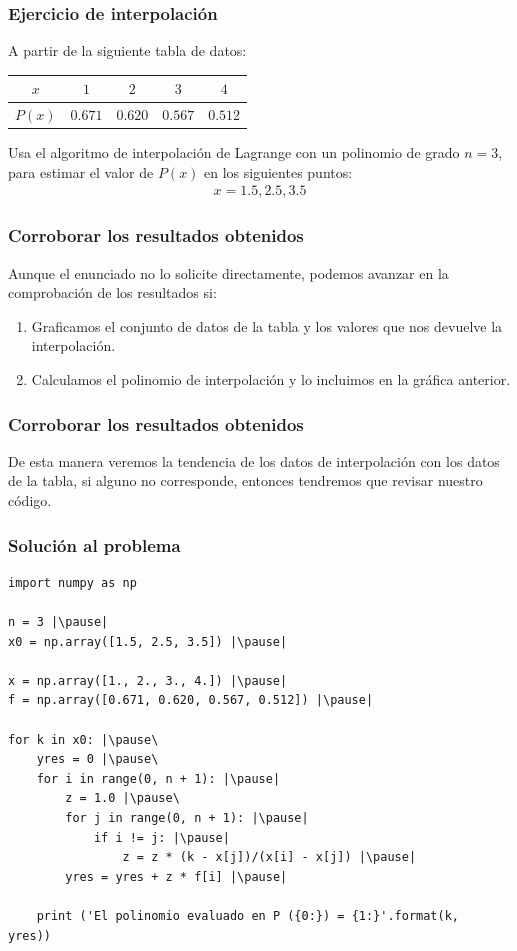 \documentclass[12pt]{beamer}
\begin{document}
\begin{frame}
\frametitle{Ejercicio de interpolación}
A partir de la siguiente tabla de datos:
\pause
\begin{center}
\renewcommand{\arraystretch}{0.9}
\begin{tabular}{c | c | c | c | c}
$x$ & $1$ & $2$ & $3$ & $4$ \\ \hline
$P (x)$ & $0.671$ & $0.620$ & $0.567$ & $0.512$ \\
\end{tabular}
\end{center}
\pause
Usa el algoritmo de interpolación de Lagrange con un polinomio de grado $n = 3$, para estimar el valor de $P (x)$ en los siguientes puntos:
\begin{align*}
x = 1.5, 2.5, 3.5
\end{align*}
\end{frame}
\begin{frame}
\frametitle{Corroborar los resultados obtenidos}
Aunque el enunciado no lo solicite directamente, podemos avanzar en la comprobación de los resultados si:
\begin{enumerate}[<+->]
\item Graficamos el conjunto de datos de la tabla y los valores que nos devuelve la interpolación.
\item Calculamos el polinomio de interpolación y lo incluimos en la gráfica anterior.
\end{enumerate}
\end{frame}
\begin{frame}
\frametitle{Corroborar los resultados obtenidos}
De esta manera veremos la tendencia de los datos de interpolación con los datos de la tabla, si alguno no corresponde, entonces tendremos que revisar nuestro código.
\end{frame}
\begin{frame}
\frametitle{Solución al problema}
\begin{lstlisting}[caption=Código para la interpolación de Lagrange, basicstyle=\linespread{0.9}\ttfamily=\small, columns=fullflexible, escapeinside={||}]
import numpy as np

n = 3 |\pause|
x0 = np.array([1.5, 2.5, 3.5]) |\pause|

x = np.array([1., 2., 3., 4.]) |\pause|
f = np.array([0.671, 0.620, 0.567, 0.512]) |\pause|

for k in x0: |\pause\
    yres = 0 |\pause\
    for i in range(0, n + 1): |\pause|
        z = 1.0 |\pause\
        for j in range(0, n + 1): |\pause|
            if i != j: |\pause|
                z = z * (k - x[j])/(x[i] - x[j]) |\pause|
        yres = yres + z * f[i] |\pause|
    
    print ('El polinomio evaluado en P ({0:}) = {1:}'.format(k,  yres))
\end{lstlisting}
\end{frame}
\end{document}
